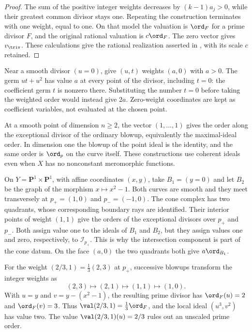 \begin{proof}
The sum of the positive integer weights decreases by
$(k-1)a_j>0$, while their greatest common divisor stays one.
Repeating the construction terminates with one weight, equal to
one. On that model the valuation is $\ord_F$ for a prime divisor
$F$, and the original rational valuation is $c\ord_F$.
The zero vector gives $v_{\triv}$. These calculations give the
rational realization asserted in
\cite[Remark~2.3.5]{MPTropicalV2}, with its scale $c$ retained.
\end{proof}

\begin{example}\label{ex:mp-monomial-zero-weights}
Near a smooth divisor $(u=0)$, give $(u,t)$ weights $(a,0)$ with
$a>0$. The germ $ut+u^2$ has value $a$ at every point of the
divisor, including $t=0$: the coefficient germ $t$ is nonzero
there. Substituting the number $t=0$ before taking the weighted
order would instead give $2a$. Zero-weight coordinates are kept
as coefficient variables, not evaluated at the chosen point.

At a smooth point of dimension $n\geq2$, the vector
$(1,\ldots,1)$ gives the order along the exceptional divisor of
the ordinary blowup, equivalently the maximal-ideal order. In
dimension one the blowup of the point ideal is the identity, and
the same order is $\ord_p$ on the curve itself. These constructions
use coherent ideals even when $X$ has no nonconstant meromorphic
functions.
\end{example}

\begin{example}\label{ex:mp-monomial-distinct-strata}
On $Y=\mathbf P^1\times\mathbf P^1$, with affine coordinates
$(x,y)$, take $B_1=(y=0)$ and let $B_2$ be the graph of the
morphism $x\mapsto x^2-1$. Both curves are smooth and they meet
transversely at $p_+=(1,0)$ and $p_-=(-1,0)$. The cone complex
has two quadrants, whose corresponding boundary rays are
identified. Their interior points of weight $(1,1)$ give the
orders of the exceptional divisors over $p_+$ and $p_-$.
Both assign value one to the ideals of $B_1$ and $B_2$, but they
assign values one and zero, respectively, to $\mathcal I_{p_+}$.
This is why the intersection component is part of the cone datum.
On the face $(a,0)$ the two quadrants both give $a\ord_{B_1}$.

For the weight $(2/3,1)=\frac13(2,3)$ at $p_+$, successive
blowups transform the integer weights as
\[
        (2,3)\longmapsto(2,1)\longmapsto(1,1)
             \longmapsto(1,0).
\]
With $u=y$ and $v=y-(x^2-1)$, the resulting prime divisor has
$\ord_F(u)=2$ and $\ord_F(v)=3$. Thus
$\val(2/3,1)=\frac13\ord_F$, and the local ideal $(u^3,v^2)$
has value two. The value $\val(2/3,1)(u)=2/3$ rules out an
unscaled prime order.
\end{example}

